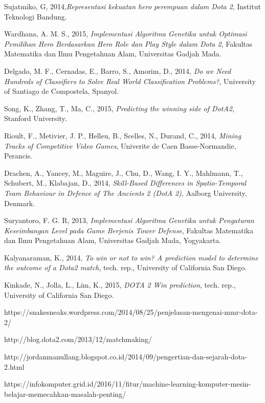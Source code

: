 \documentclass[skripsi]{ugmskripsi}
\begin{document}
\begin{thebibliography}{99}
Sujatmiko, G, 2014,\emph{Representasi kekuatan hero perempuan dalam Dota 2}, Institut Teknologi Bandung.

Wardhana, A. M. S., 2015, \emph{Implementasi Algoritma Genetika untuk Optimasi Pemilihan Hero Berdasarkan Hero Role dan Play Style dalam Dota 2}, Fakultas Matematika dan Ilmu Pengetahuan Alam, Universitas Gadjah Mada.

Delgado, M. F., Cernadas, E., Barro, S., Amorim, D., 2014,  \emph{Do we Need Hundreds of Classifiers to Solve Real World Classification Problems?}, University of Santiago de Compostela, Spanyol.

Song, K., Zhang, T., Ma, C., 2015, \emph{Predicting the winning side of DotA2}, Stanford University.

Rioult, F., Metivier, J. P., Helleu, B., Scelles, N., Durand, C., 2014, \emph{Mining Tracks of Competitive Video Games}, Univerite de Caen Basse-Normandie, Perancis.

Drachen, A., Yancey, M., Maguire, J., Chu, D., Wang, I. Y., Mahlmann, T., Schubert, M., Klabajan, D., 2014, \emph{Skill-Based Differences in Spatio-Temporal Team Behaviour in Defence of The Ancients 2 (DotA 2)}, Aalborg University, Denmark.

Suryantoro, F. G. R, 2013, \emph{Implementasi Algoritma Genetika untuk Pengaturan Keseimbangan Level pada Game Berjenis Tower Defense}, Fakultas Matematika dan Ilmu Pengetahuan Alam, Universitas Gadjah Mada, Yogyakarta.

Kalyanaraman, K., 2014, \emph{To win or not to win? A prediction model to determine the outcome of a Dota2 match}, tech. rep., University of California San Diego.

Kinkade, N., Jolla, L., Lim, K., 2015, \emph{DOTA 2 Win prediction},  tech. rep., University of California San Diego.

https://snakesneaks.wordpress.com/2014/08/25/penjelasan-mengenai-mmr-dota-2/

http://blog.dota2.com/2013/12/matchmaking/

http://jordanmanullang.blogspot.co.id/2014/09/pengertian-dan-sejarah-dota-2.html

https://infokomputer.grid.id/2016/11/fitur/machine-learning-komputer-mesin-belajar-memecahkan-masalah-penting/

\end{thebibliography}
\end{document}
